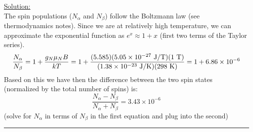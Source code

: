 \noindent
\underline{Solution:}\\

\noindent
The spin populations ($N_{\alpha}$ and $N_{\beta}$) follow the Boltzmann law (see thermodynamics notes). Since we are at
relatively high temperature, we can approximate the exponential function as $e^x \approx 1 + x$ (first two terms of the Taylor series).
$$\frac{N_{\alpha}}{N_{\beta}} = 1 + \frac{g_N\mu_NB}{kT} = 1 + \frac{(5.585)(5.05\times 10^{-27}\textnormal{ J/T)}(1\textnormal{ T})}{(1.38\times 10^{-23}\textnormal{ J/K})(298\textnormal{ K})} = 1 + 6.86\times 10^{-6}$$
Based on this we have then the difference between the two spin states (normalized by the total number of spins) is:
$$\frac{N_{\alpha} - N_{\beta}}{N_{\alpha} + N_{\beta}} = 3.43\times 10^{-6}$$
(solve for $N_{\alpha}$ in terms of $N_{\beta}$ in the first equation and plug into the second)
\hrule\vspace{0.5cm}
